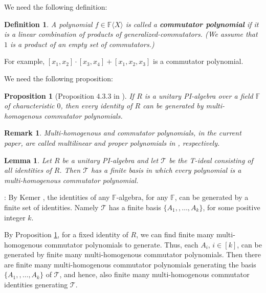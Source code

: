 \documentclass[12pt,reqno]{article}
\newtheorem{lemma}[theorem]{Lemma}
\newtheorem{definition}{Definition}
\newtheorem{proposition}[theorem]{Proposition}
\newtheorem*{remark*}{Remark}
\newcommand\F{\ensuremath{\mathbb F}}
\newcommand{\cd}{\cdot}
\newcommand{\freea}{\ensuremath{\F\langle X\rangle}}
\newenvironment{proof}{\QuadSpace\par\noindent{\bf Proof}:}{\EndProof\HalfSpace}
\newcommand{\QuadSpace}{\vspace{0.25\baselineskip}}
\newcommand{\HalfSpace}{\vspace{0.5\baselineskip}}
\newcommand{\EndProof}{ \hfill \vrule width 1ex height 1ex depth 0pt }
\newcommand{\iddocomment}[2][]
{\todo[size=\tiny, caption={#2}, #1, linecolor=green!70!white,         backgroundcolor=blue!10!white,bordercolor=white]
{{#2}}}
\begin{document}
We need the following definition:%


\begin{definition}\label{def:commutator_identity}
A polynomial $f\in \freea$ is called a \textbf{commutator polynomial} if it is a linear combination of products of generalized-commutators.
(We assume that $1$ is a product of an empty set of commutators.) \end{definition}
For example, $[x_1,x_2]\cd[x_3,x_4]+[x_1,x_2,x_3]$ is a commutator polynomial.


We need the following proposition:
\begin{proposition}[Proposition $4.3.3$ in \cite{Dre99}]
\label{prop:generated-by-multi-commutator-polynomial}
   If $R$ is a unitary PI-algebra over a field $\F$ of characteristic $0$, then every identity of $R$ can be generated by  multi-homogenous commutator  polynomials.
\end{proposition}
\begin{remark*}
\emph{Multi-homogenous} and \emph{commutator polynomials}, in the current paper, are called \emph{multilinear} and \emph{proper polynomials} in \cite{Dre99}, respectively.
\end{remark*}


\begin{lemma}\label{lem:special-basis}
  Let $R$ be a  unitary PI-algebra  and let  $\mathcal T$ be the T-ideal consisting of all identities of $R$. Then $\mathcal T$ has a  finite basis in which every polynomial is a multi-homogenous commutator polynomial.
\end{lemma}

\begin{proof}
By Kemer \cite{Kem87}, the identities of any $\F$-algebra, for any \F, \iddocomment{Is it for any field?}  can be generated by a finite set of identities. Namely $\mathcal T$ has a finite basis $\{A_1, ,\ldots,  A_k\}$, for some positive integer $k$.


By Proposition \ref{prop:generated-by-multi-commutator-polynomial}, for a fixed identity of $R$, we can find finite many  multi-homogenous commutator  polynomials to generate.
Thus, each $A_i,\,i\in[k]$, can be generated by finite many  multi-homogenous commutator polynomials. Then there are finite many multi-homogenous commutator polynomials generating the basis $\{A_1, ,\ldots, A_k\}$ of $\mathcal T$, and hence, also finite many multi-homogenous commutator identities generating $\mathcal T$.

\end{proof}
\end{document}
